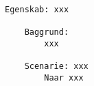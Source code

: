 



\begin{lstlisting}[language=Gherkin]
Egenskab: xxx

    Baggrund:
        xxx
        
    Scenarie: xxx
        Naar xxx

\end{lstlisting}